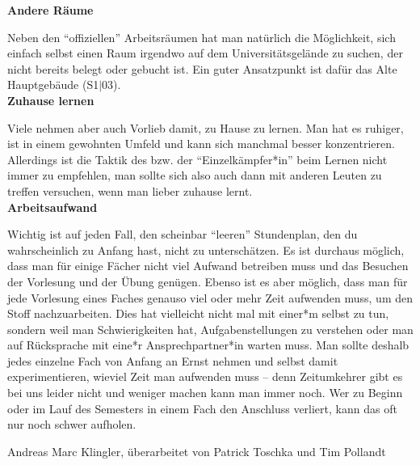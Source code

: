 {    \noindent\textbf{Andere Räume}

    Neben den "`offiziellen"' Arbeitsräumen hat man natürlich die Möglichkeit, sich einfach selbst einen Raum irgendwo auf dem Universitätsgelände zu suchen, der nicht bereits belegt oder gebucht ist. Ein guter Ansatzpunkt ist dafür das Alte Hauptgebäude (S1$|$03).\\

    \noindent\textbf{Zuhause lernen}

    Viele nehmen aber auch Vorlieb damit, zu Hause zu lernen. Man hat es ruhiger, ist in einem gewohnten Umfeld und kann sich manchmal besser konzentrieren. Allerdings ist die Taktik des bzw. der "`Einzelkämpfer*in"' beim Lernen nicht immer zu empfehlen, man sollte sich also auch dann mit anderen Leuten zu treffen versuchen, wenn man lieber zuhause lernt.\\

    \noindent\textbf{Arbeitsaufwand}

    Wichtig ist auf jeden Fall, den scheinbar "`leeren"' Stundenplan, den du wahrscheinlich zu Anfang hast, nicht zu unterschätzen. Es ist durchaus möglich, dass man für einige Fächer nicht viel Aufwand betreiben muss und das Besuchen der Vorlesung und der Übung genügen. Ebenso ist es aber möglich, dass man für jede Vorlesung eines Faches genauso viel oder mehr Zeit aufwenden muss, um den Stoff nachzuarbeiten. Dies hat vielleicht nicht mal mit einer*m selbst zu tun, sondern weil man Schwierigkeiten hat, Aufgabenstellungen zu verstehen oder man auf Rücksprache mit eine*r Ansprechpartner*in warten muss. Man sollte deshalb jedes einzelne Fach von Anfang an Ernst nehmen und selbst damit experimentieren, wieviel Zeit man aufwenden muss – denn Zeitumkehrer gibt es bei uns leider nicht und weniger machen kann man immer noch. Wer zu Beginn oder im Lauf des Semesters in einem Fach den Anschluss verliert, kann das oft nur noch schwer aufholen.
}
{Andreas Marc Klingler, überarbeitet von Patrick Toschka und Tim Pollandt}
